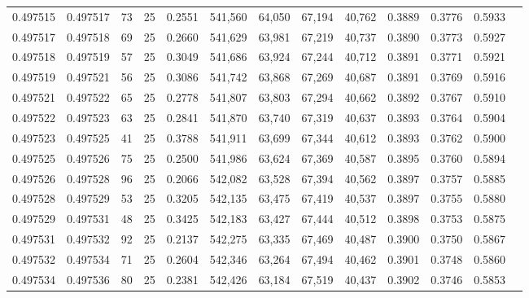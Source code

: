 \begin{tabular}{rrrrrrrrrrrrr}
0.497515 & 0.497517 &    73 &  25 &                                     0.2551 & 541,560 &  64,050 &  67,194 &  40,762 & 0.3889 & 0.3776 & 0.5933 \\
0.497517 & 0.497518 &    69 &  25 &                                     0.2660 & 541,629 &  63,981 &  67,219 &  40,737 & 0.3890 & 0.3773 & 0.5927 \\
0.497518 & 0.497519 &    57 &  25 &                                     0.3049 & 541,686 &  63,924 &  67,244 &  40,712 & 0.3891 & 0.3771 & 0.5921 \\
0.497519 & 0.497521 &    56 &  25 &                                     0.3086 & 541,742 &  63,868 &  67,269 &  40,687 & 0.3891 & 0.3769 & 0.5916 \\
0.497521 & 0.497522 &    65 &  25 &                                     0.2778 & 541,807 &  63,803 &  67,294 &  40,662 & 0.3892 & 0.3767 & 0.5910 \\
0.497522 & 0.497523 &    63 &  25 &                                     0.2841 & 541,870 &  63,740 &  67,319 &  40,637 & 0.3893 & 0.3764 & 0.5904 \\
0.497523 & 0.497525 &    41 &  25 &                                     0.3788 & 541,911 &  63,699 &  67,344 &  40,612 & 0.3893 & 0.3762 & 0.5900 \\
0.497525 & 0.497526 &    75 &  25 &                                     0.2500 & 541,986 &  63,624 &  67,369 &  40,587 & 0.3895 & 0.3760 & 0.5894 \\
0.497526 & 0.497528 &    96 &  25 &                                     0.2066 & 542,082 &  63,528 &  67,394 &  40,562 & 0.3897 & 0.3757 & 0.5885 \\
0.497528 & 0.497529 &    53 &  25 &                                     0.3205 & 542,135 &  63,475 &  67,419 &  40,537 & 0.3897 & 0.3755 & 0.5880 \\
0.497529 & 0.497531 &    48 &  25 &                                     0.3425 & 542,183 &  63,427 &  67,444 &  40,512 & 0.3898 & 0.3753 & 0.5875 \\
0.497531 & 0.497532 &    92 &  25 &                                     0.2137 & 542,275 &  63,335 &  67,469 &  40,487 & 0.3900 & 0.3750 & 0.5867 \\
0.497532 & 0.497534 &    71 &  25 &                                     0.2604 & 542,346 &  63,264 &  67,494 &  40,462 & 0.3901 & 0.3748 & 0.5860 \\
0.497534 & 0.497536 &    80 &  25 &                                     0.2381 & 542,426 &  63,184 &  67,519 &  40,437 & 0.3902 & 0.3746 & 0.5853 \\

\end{tabular}
